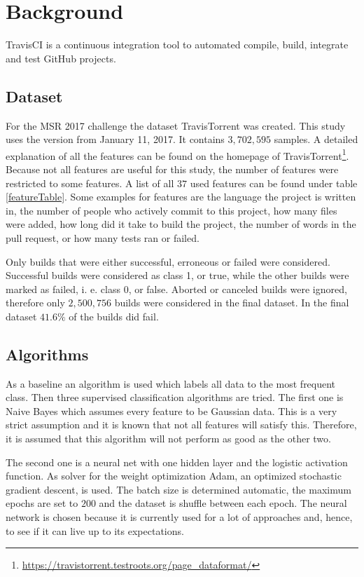 \documentclass[a4paper,11pt]{article}
\begin{document}
\section{Background}

TravisCI is a continuous integration tool to automated compile, build, integrate and test GitHub projects. 

\subsection{Dataset}

For the MSR 2017 challenge the dataset TravisTorrent\cite{msr17challenge} was created. This study uses the version from January 11, 2017. It contains $3,702,595$ samples. A detailed explanation of all the features can be found on the homepage of TravisTorrent\footnote{\url{https://travistorrent.testroots.org/page_dataformat/}}. Because not all features are useful for this study, the number of features were restricted to some features. A list of all $37$ used features can be found under table \ref{featureTable}. 
Some examples for features are the language the project is written in, the number of people who actively commit to this project, how many files were added, how long did it take to build the project, the number of words in the pull request, or how many tests ran or failed.

Only builds that were either successful, erroneous or failed were considered. Successful builds were considered as class 1, or true, while the other builds were marked as failed, i. e. class 0, or false. Aborted or canceled builds were ignored, therefore only $2,500,756$ builds were considered in the final dataset. In the final dataset $41.6\%$ of the builds did fail. 


\subsection{Algorithms}

As a baseline an algorithm is used which labels all data to the most frequent class. Then three supervised classification algorithms are tried. 
The first one is Naive Bayes which assumes every feature to be Gaussian data. This is a very strict assumption and it is known that not all features will satisfy this. Therefore, it is assumed that this algorithm will not perform as good as the other two. 

The second one is a neural net with one hidden layer and the logistic activation function. As solver for the weight optimization Adam\cite{adam}, an optimized stochastic gradient descent, is used. The batch size is determined automatic, the maximum epochs are set to $200$ and the dataset is shuffle between each epoch. The neural network is chosen because it is currently used for a lot of approaches and, hence, to see if it can live up to its expectations.
\end{document}

